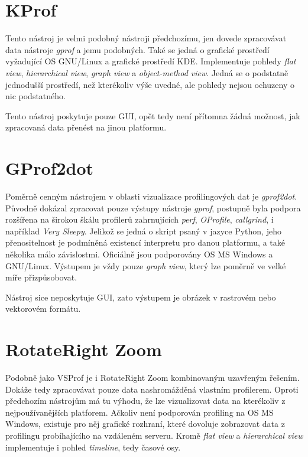 \documentclass[czech,BP]{thesiskiv}
\begin{document}
\section{KProf}

Tento nástroj je velmi podobný nástroji předchozímu, jen dovede zpracovávat data nástroje \emph{gprof} a jemu podobných. Také se jedná o grafické prostředí vyžadující OS GNU/Linux a grafické prostředí KDE. Implementuje pohledy \emph{flat view}, \emph{hierarchical view}, \emph{graph view} a \emph{object-method view}. Jedná se o podstatně jednodušší prostředí, než kterékoliv výše uvedné, ale pohledy nejsou ochuzeny o nic podstatného.

Tento nástroj poskytuje pouze GUI, opět tedy není přítomna žádná možnost, jak zpracovaná data přenést na jinou platformu.

\section{GProf2dot}

Poměrně cenným nástrojem v oblasti vizualizace profilingových dat je \emph{gprof2dot}. Původně dokázal zpracovat pouze výstupy nástroje \emph{gprof}, postupně byla podpora rozšířena na širokou škálu profilerů zahrnujících \emph{perf}, \emph{OProfile}, \emph{callgrind}, i například \emph{Very Sleepy}. Jelikož se jedná o skript psaný v jazyce Python, jeho přenositelnost je podmíněná existencí interpretu pro danou platformu, a také několika málo závislostmi. Oficiálně jsou podporovány OS MS Windows a GNU/Linux. Výstupem je vždy pouze \emph{graph view}, který lze poměrně ve velké míře přizpůsobovat.

Nástroj sice neposkytuje GUI, zato výstupem je obrázek v rastrovém nebo vektorovém formátu.

\section{RotateRight Zoom}

Podobně jako VSProf je i RotateRight Zoom kombinovaným uzavřeným řešením. Dokáže tedy zpracovávat pouze data nashromážděná vlastním profilerem. Oproti předchozím nástrojům má tu výhodu, že lze vizualizovat data na kterékoliv z nejpoužívanějších platforem. Ačkoliv není podporován profiling na OS MS Windows, existuje pro něj grafické rozhraní, které dovoluje zobrazovat data z profilingu probíhajícího na vzdáleném serveru. Kromě \emph{flat view} a \emph{hierarchical view} implementuje i pohled \emph{timeline}, tedy časové osy.
\end{document}
